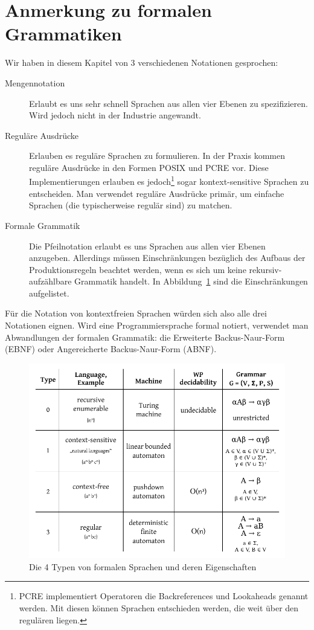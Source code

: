 \section{Anmerkung zu formalen Grammatiken}
%
Wir haben in diesem Kapitel von 3 verschiedenen Notationen gesprochen:
\begin{description}
  \item[Mengennotation] Erlaubt es uns sehr schnell Sprachen aus allen vier Ebenen zu spezifizieren. Wird jedoch nicht in der Industrie angewandt.
  \item[Reguläre Ausdrücke] Erlauben es reguläre Sprachen zu formulieren. In der Praxis kommen reguläre Ausdrücke in den Formen POSIX und PCRE vor. Diese Implementierungen erlauben es jedoch\footnote{PCRE implementiert Operatoren die Backreferences und Lookaheads genannt werden. Mit diesen können Sprachen entschieden werden, die weit über den regulären liegen.} sogar kontext-sensitive Sprachen zu entscheiden. Man verwendet reguläre Ausdrücke primär, um einfache Sprachen (die typischerweise regulär sind) zu matchen.
  \item[Formale Grammatik] Die Pfeilnotation erlaubt es uns Sprachen aus allen vier Ebenen anzugeben. Allerdings müssen Einschränkungen bezüglich des Aufbaus der Produktionsregeln beachtet werden, wenn es sich um keine rekursiv-aufzählbare Grammatik handelt. In Abbildung~\ref{fig:grammars} sind die Einschränkungen aufgelistet.
\end{description}

Für die Notation von kontextfreien Sprachen würden sich also alle drei Notationen eignen. Wird eine Programmiersprache formal notiert, verwendet man Abwandlungen der formalen Grammatik: die Erweiterte Backus-Naur-Form (EBNF) oder Angereicherte Backus-Naur-Form (ABNF).

\begin{figure}[h]
 \begin{center}
  \includegraphics{img/grammar_types.pdf}
  \caption{Die 4 Typen von formalen Sprachen und deren Eigenschaften}
  \label{fig:grammars}
 \end{center}
\end{figure}
